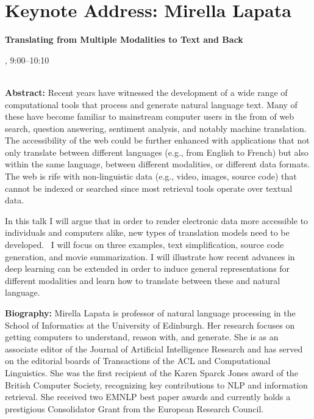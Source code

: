 \section{Keynote Address: Mirella Lapata}

\begin{center}
\begin{Large}
{\bfseries\Large Translating from Multiple Modalities to Text and Back}\vspace{1em}\par
\end{Large}

\daydateyear, 9:00--10:10 \vspace{1em}\\
\PlenaryLoc \\
\vspace{1em}\par
\end{center}

\noindent
{\bfseries Abstract:} Recent years have witnessed the development of a wide range of computational tools that process and generate natural language text. Many of these have become familiar to mainstream computer users in the from of web search, question answering, sentiment analysis, and notably machine translation. The accessibility of the web could be further enhanced with applications that not only translate between different languages (e.g., from English to French) but also within the same language, between different modalities, or different data formats. The web is rife with non-linguistic data (e.g., video, images, source code) that cannot be indexed or searched since most retrieval tools operate over textual data.

In this talk I will argue that in order to render electronic data more accessible to individuals and computers alike, new types of translation models need to be developed.  I will focus on three examples, text simplification, source code generation, and movie summarization. I will illustrate how recent advances in deep learning can be extended in order to induce general representations for different modalities and learn how to translate between these and natural language.

\vspace{3em}\par 

\vfill
\noindent

{\bfseries Biography:} Mirella Lapata is professor of natural language processing in the School of Informatics at the University of Edinburgh. Her research focuses on getting computers to understand, reason with, and generate. She is as an associate editor of the Journal of Artificial Intelligence Research and has served on the editorial boards of Transactions of the ACL and Computational Linguistics. She was the first recipient of the Karen Sparck Jones award of the British Computer Society, recognizing key contributions to NLP and information retrieval. She received two EMNLP best paper awards and currently holds a prestigious Consolidator Grant from the European Research Council.

\newpage
